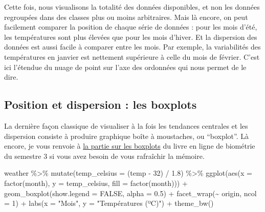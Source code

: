 \documentclass[
  a4paper,
  DIV=11,
  numbers=noendperiod,
  oneside]{scrreprt}
\newenvironment{Shaded}{}{}
\newcommand{\AttributeTok}[1]{\textcolor[rgb]{0.84,0.23,0.29}{#1}}
\newcommand{\ConstantTok}[1]{\textcolor[rgb]{0.00,0.36,0.77}{#1}}
\newcommand{\DecValTok}[1]{\textcolor[rgb]{0.00,0.36,0.77}{#1}}
\newcommand{\FloatTok}[1]{\textcolor[rgb]{0.00,0.36,0.77}{#1}}
\newcommand{\FunctionTok}[1]{\textcolor[rgb]{0.44,0.26,0.76}{#1}}
\newcommand{\NormalTok}[1]{\textcolor[rgb]{0.14,0.16,0.18}{#1}}
\newcommand{\SpecialCharTok}[1]{\textcolor[rgb]{0.00,0.36,0.77}{#1}}
\newcommand{\StringTok}[1]{\textcolor[rgb]{0.01,0.18,0.38}{#1}}
\begin{document}
Cette fois, nous visualisons la totalité des données disponibles, et non
les données regroupées dans des classes plus ou moins arbitraires. Mais
là encore, on peut facilement comparer la position de chaque série de
données : pour les mois d'été, les températures sont plus élevées que
pour les mois d'hiver. Et la dispersion des données est aussi facile à
comparer entre les mois. Par exemple, la variabilités des températures
en janvier est nettement supérieure à celle du mois de février. C'est
ici l'étendue du nuage de point sur l'axe des ordonnées qui nous permet
de le dire.

\hypertarget{position-et-dispersion-les-boxplots}{%
\subsection{Position et dispersion : les
boxplots}\label{position-et-dispersion-les-boxplots}}

La dernière façon classique de visualiser à la fois les tendances
centrales et les dispersion consiste à produire graphique boîte à
moustaches, ou ``boxplot''. Là encore, je vous renvoie à
\href{https://besibo.github.io/BiometrieS3/03-visualization.html\#les-boîtes-à-moustaches-ou-boxplots}{la
partie sur les boxplots} du livre en ligne de biométrie du semestre 3 si
vous avez besoin de vous rafraîchir la mémoire.

\begin{Shaded}
\begin{Highlighting}[]
\NormalTok{weather }\SpecialCharTok{\%\textgreater{}\%} 
  \FunctionTok{mutate}\NormalTok{(}\AttributeTok{temp\_celsius =}\NormalTok{ (temp }\SpecialCharTok{{-}} \DecValTok{32}\NormalTok{) }\SpecialCharTok{/} \FloatTok{1.8}\NormalTok{) }\SpecialCharTok{\%\textgreater{}\%} 
  \FunctionTok{ggplot}\NormalTok{(}\FunctionTok{aes}\NormalTok{(}\AttributeTok{x =} \FunctionTok{factor}\NormalTok{(month), }\AttributeTok{y =}\NormalTok{ temp\_celsius, }\AttributeTok{fill =} \FunctionTok{factor}\NormalTok{(month))) }\SpecialCharTok{+}
  \FunctionTok{geom\_boxplot}\NormalTok{(}\AttributeTok{show.legend =} \ConstantTok{FALSE}\NormalTok{, }\AttributeTok{alpha =} \FloatTok{0.5}\NormalTok{) }\SpecialCharTok{+}
  \FunctionTok{facet\_wrap}\NormalTok{(}\SpecialCharTok{\textasciitilde{}}\NormalTok{ origin, }\AttributeTok{ncol =} \DecValTok{1}\NormalTok{) }\SpecialCharTok{+}
  \FunctionTok{labs}\NormalTok{(}\AttributeTok{x =} \StringTok{"Mois"}\NormalTok{, }\AttributeTok{y =} \StringTok{"Températures (ºC)"}\NormalTok{) }\SpecialCharTok{+}
  \FunctionTok{theme\_bw}\NormalTok{()}
\end{Highlighting}
\end{Shaded}
\end{document}
